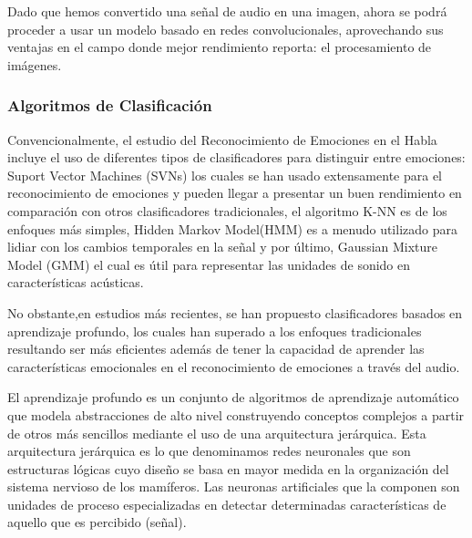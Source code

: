 \documentclass[11pt,a4paper,spanish]{book}
\begin{document}
	Dado que hemos convertido una señal de audio en una imagen, ahora se podrá proceder a usar un modelo basado en redes convolucionales, aprovechando sus ventajas en el campo donde mejor rendimiento reporta: el procesamiento de imágenes.
	
	
	\subsubsection{Algoritmos de Clasificación}
	

	Convencionalmente, el estudio del Reconocimiento de Emociones en el Habla incluye el uso de diferentes tipos de clasificadores para distinguir entre emociones: Suport Vector Machines (SVNs) los cuales se han usado extensamente
	para el reconocimiento de emociones y pueden llegar a presentar un buen rendimiento en comparación con otros clasificadores tradicionales, el algoritmo K-NN es de los enfoques más simples, Hidden Markov Model(HMM) es a menudo utilizado para lidiar con los cambios temporales en la señal y por último, Gaussian Mixture Model (GMM) el cual es útil para representar las unidades de sonido en características acústicas.%

	No obstante,en estudios más recientes, se han propuesto clasificadores basados en aprendizaje profundo, los cuales han superado a los enfoques tradicionales resultando ser más eficientes además de tener la capacidad de aprender las características emocionales en el reconocimiento de emociones a través del audio.
	
	El aprendizaje profundo es un conjunto de algoritmos de aprendizaje automático que modela abstracciones de alto nivel construyendo conceptos complejos a partir de otros más sencillos mediante el uso de una arquitectura jerárquica.
	Esta arquitectura jerárquica es lo que denominamos redes neuronales que son estructuras lógicas cuyo diseño se basa en mayor medida en la organización del sistema nervioso de los mamíferos. %
	Las neuronas artificiales que la componen son unidades de proceso especializadas en detectar determinadas características de aquello que es percibido (señal).
	
\end{document}
